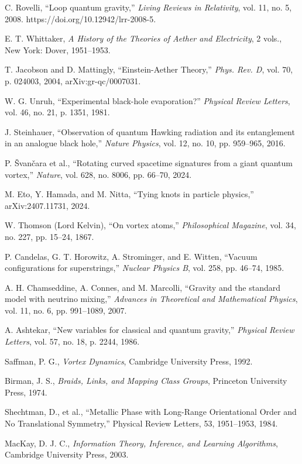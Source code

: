 \begin{thebibliography}{99}

 C. Rovelli, ``Loop quantum gravity,'' \emph{Living Reviews in Relativity}, vol. 11, no. 5, 2008. https://doi.org/10.12942/lrr-2008-5.

 E. T. Whittaker, \emph{A History of the Theories of Aether and Electricity}, 2 vols., New York: Dover, 1951--1953.

 T. Jacobson and D. Mattingly, ``Einstein-Aether Theory,'' \emph{Phys. Rev. D}, vol. 70, p. 024003, 2004, arXiv:gr-qc/0007031.

 W. G. Unruh, ``Experimental black-hole evaporation?'' \emph{Physical Review Letters}, vol. 46, no. 21, p. 1351, 1981.

 J. Steinhauer, ``Observation of quantum Hawking radiation and its entanglement in an analogue black hole,'' \emph{Nature Physics}, vol. 12, no. 10, pp. 959--965, 2016.

 P. Švančara et al., ``Rotating curved spacetime signatures from a giant quantum vortex,'' \emph{Nature}, vol. 628, no. 8006, pp. 66--70, 2024.

 M. Eto, Y. Hamada, and M. Nitta, ``Tying knots in particle physics,'' arXiv:2407.11731, 2024.

 W. Thomson (Lord Kelvin), ``On vortex atoms,'' \emph{Philosophical Magazine}, vol. 34, no. 227, pp. 15--24, 1867.

 P. Candelas, G. T. Horowitz, A. Strominger, and E. Witten, ``Vacuum configurations for superstrings,'' \emph{Nuclear Physics B}, vol. 258, pp. 46--74, 1985.

 A. H. Chamseddine, A. Connes, and M. Marcolli, ``Gravity and the standard model with neutrino mixing,'' \emph{Advances in Theoretical and Mathematical Physics}, vol. 11, no. 6, pp. 991--1089, 2007.

 A. Ashtekar, ``New variables for classical and quantum gravity,'' \emph{Physical Review Letters}, vol. 57, no. 18, p. 2244, 1986.

 Saffman, P. G., \emph{Vortex Dynamics}, Cambridge University Press, 1992.

 Birman, J. S., \emph{Braids, Links, and Mapping Class Groups}, Princeton University Press, 1974.

 Shechtman, D., et al., ``Metallic Phase with Long-Range Orientational Order and No Translational Symmetry,'' Physical Review Letters, 53, 1951--1953, 1984.

 MacKay, D. J. C., \emph{Information Theory, Inference, and Learning Algorithms}, Cambridge University Press, 2003.

\end{thebibliography}
